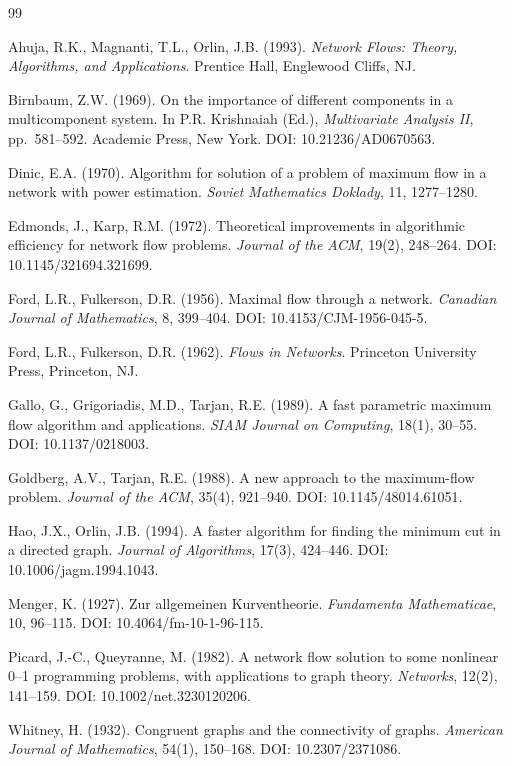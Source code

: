 \documentclass[12pt]{report}
\begin{document}
\clearpage


\begin{thebibliography}{99}

Ahuja, R.K., Magnanti, T.L., Orlin, J.B. (1993). \textit{Network Flows: Theory, Algorithms, and Applications}. Prentice Hall, Englewood Cliffs, NJ.

Birnbaum, Z.W. (1969). On the importance of different components in a multicomponent system. In P.R. Krishnaiah (Ed.), \textit{Multivariate Analysis II}, pp.\ 581--592. Academic Press, New York. DOI: 10.21236/AD0670563.

Dinic, E.A. (1970). Algorithm for solution of a problem of maximum flow in a network with power estimation. \textit{Soviet Mathematics Doklady}, 11, 1277--1280.

Edmonds, J., Karp, R.M. (1972). Theoretical improvements in algorithmic efficiency for network flow problems. \textit{Journal of the ACM}, 19(2), 248--264. DOI: 10.1145/321694.321699.

Ford, L.R., Fulkerson, D.R. (1956). Maximal flow through a network. \textit{Canadian Journal of Mathematics}, 8, 399--404. DOI: 10.4153/CJM-1956-045-5.

Ford, L.R., Fulkerson, D.R. (1962). \textit{Flows in Networks}. Princeton University Press, Princeton, NJ.

Gallo, G., Grigoriadis, M.D., Tarjan, R.E. (1989). A fast parametric maximum flow algorithm and applications. \textit{SIAM Journal on Computing}, 18(1), 30--55. DOI: 10.1137/0218003.

Goldberg, A.V., Tarjan, R.E. (1988). A new approach to the maximum-flow problem. \textit{Journal of the ACM}, 35(4), 921--940. DOI: 10.1145/48014.61051.

Hao, J.X., Orlin, J.B. (1994). A faster algorithm for finding the minimum cut in a directed graph. \textit{Journal of Algorithms}, 17(3), 424--446. DOI: 10.1006/jagm.1994.1043.

Menger, K. (1927). Zur allgemeinen Kurventheorie. \textit{Fundamenta Mathematicae}, 10, 96--115. DOI: 10.4064/fm-10-1-96-115.

Picard, J.-C., Queyranne, M. (1982). A network flow solution to some nonlinear 0--1 programming problems, with applications to graph theory. \textit{Networks}, 12(2), 141--159. DOI: 10.1002/net.3230120206.

Whitney, H. (1932). Congruent graphs and the connectivity of graphs. \textit{American Journal of Mathematics}, 54(1), 150--168. DOI: 10.2307/2371086.

\end{thebibliography}
\end{document}
